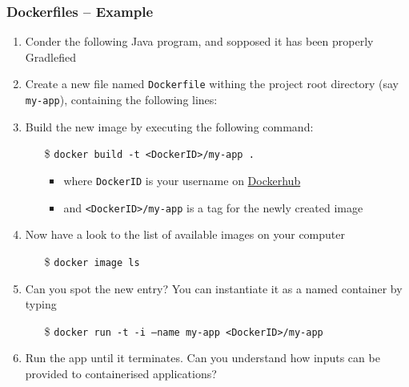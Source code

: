 \documentclass[presentation]{beamer}\mode<presentation>{\usetheme{AMSBolognaFC}}
\begin{document}
\begin{frame}[allowframebreaks]
\frametitle{Dockerfiles -- Example}

    \begin{enumerate}
        \item Conder the following Java program, and sopposed it has been properly Gradlefied
        

        \framebreak

        \item Create a new file named \alert{\texttt{Dockerfile}} withing the project root directory (say \alert{\texttt{my-app}}), containing the following lines:
        

        \framebreak

        \item Build the new image by executing the following command:
        \begin{itemize}
            \item[\$] \texttt{docker \alert{build} -t <DockerID>/my-app \alert{.}}
            \begin{itemize}
                \item where \texttt{DockerID} is your username on \href{https://hub.docker.com/}{Dockerhub}
                \item and \alert{\texttt{<DockerID>/my-app}} is a \alert{tag} for the newly created image
            \end{itemize}
        \end{itemize}

        \item Now have a look to the list of available images on your computer
        \begin{itemize}
            \item[\$] \texttt{docker image ls}
        \end{itemize}

        \item Can you spot the new entry? You can instantiate it as a \alert{named} container by typing
        \begin{itemize}
            \item[\$] \texttt{docker run -t -i \alert{--name my-app} <DockerID>/my-app}
        \end{itemize}

        \item Run the app until it terminates. Can you understand how inputs can be provided to containerised applications?


\end{enumerate}
\end{frame}
\end{document}
